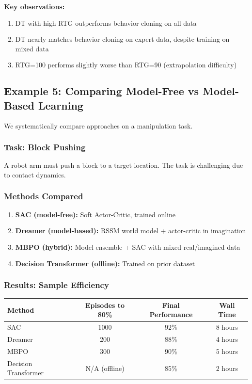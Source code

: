 \textbf{Key observations:}
\begin{enumerate}
    \item DT with high RTG outperforms behavior cloning on all data
    \item DT nearly matches behavior cloning on expert data, despite training on mixed data
    \item RTG=100 performs slightly worse than RTG=90 (extrapolation difficulty)
\end{enumerate}

\subsection{Example 5: Comparing Model-Free vs Model-Based Learning}

We systematically compare approaches on a manipulation task.

\subsubsection{Task: Block Pushing}

A robot arm must push a block to a target location. The task is challenging due to contact dynamics.

\subsubsection{Methods Compared}

\begin{enumerate}
    \item \textbf{SAC (model-free):} Soft Actor-Critic, trained online
    \item \textbf{Dreamer (model-based):} RSSM world model + actor-critic in imagination
    \item \textbf{MBPO (hybrid):} Model ensemble + SAC with mixed real/imagined data
    \item \textbf{Decision Transformer (offline):} Trained on prior dataset
\end{enumerate}

\subsubsection{Results: Sample Efficiency}

\begin{center}
\begin{tabular}{lccc}
\toprule
\textbf{Method} & \textbf{Episodes to 80\%} & \textbf{Final Performance} & \textbf{Wall Time} \\
\midrule
SAC & 1000 & 92\% & 8 hours \\
Dreamer & 200 & 88\% & 4 hours \\
MBPO & 300 & 90\% & 5 hours \\
Decision Transformer & N/A (offline) & 85\% & 2 hours \\
\bottomrule
\end{tabular}
\end{center}

